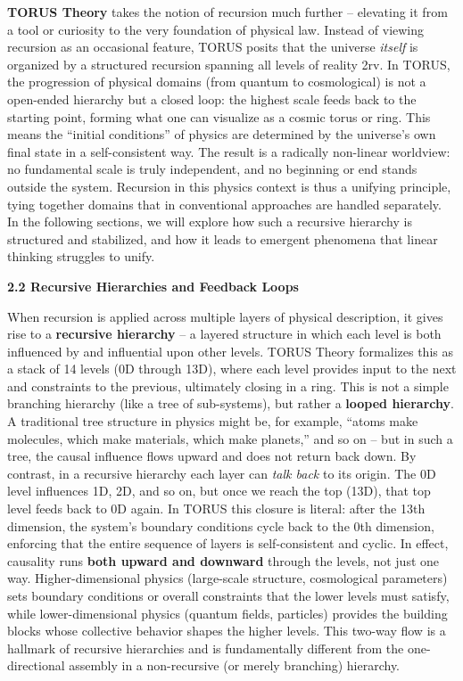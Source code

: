\textbf{TORUS Theory} takes the notion of recursion much further --
elevating it from a tool or curiosity to the very foundation of physical
law. Instead of viewing recursion as an occasional feature, TORUS posits
that the universe \emph{itself} is organized by a structured recursion
spanning all levels of reality​ 2rv. In TORUS, the progression of
physical domains (from quantum to cosmological) is not a open-ended
hierarchy but a closed loop: the highest scale feeds back to the
starting point, forming what one can visualize as a cosmic torus or
ring. This means the ``initial conditions'' of physics are determined by
the universe's own final state in a self-consistent way. The result is a
radically non-linear worldview: no fundamental scale is truly
independent, and no beginning or end stands outside the system.
Recursion in this physics context is thus a unifying principle, tying
together domains that in conventional approaches are handled separately.
In the following sections, we will explore how such a recursive
hierarchy is structured and stabilized, and how it leads to emergent
phenomena that linear thinking struggles to unify.

\textbf{2.2 Recursive Hierarchies and Feedback Loops}

When recursion is applied across multiple layers of physical
description, it gives rise to a \textbf{recursive hierarchy} -- a
layered structure in which each level is both influenced by and
influential upon other levels. TORUS Theory formalizes this as a stack
of 14 levels (0D through 13D), where each level provides input to the
next and constraints to the previous, ultimately closing in a ring. This
is not a simple branching hierarchy (like a tree of sub-systems), but
rather a \textbf{looped hierarchy}. A traditional tree structure in
physics might be, for example, ``atoms make molecules, which make
materials, which make planets,'' and so on -- but in such a tree, the
causal influence flows upward and does not return back down. By
contrast, in a recursive hierarchy each layer can \emph{talk back} to
its origin. The 0D level influences 1D, 2D, and so on, but once we reach
the top (13D), that top level feeds back to 0D again​. In TORUS this
closure is literal: after the 13th dimension, the system's boundary
conditions cycle back to the 0th dimension, enforcing that the entire
sequence of layers is self-consistent and cyclic. In effect, causality
runs \textbf{both upward and downward} through the levels, not just one
way. Higher-dimensional physics (large-scale structure, cosmological
parameters) sets boundary conditions or overall constraints that the
lower levels must satisfy, while lower-dimensional physics (quantum
fields, particles) provides the building blocks whose collective
behavior shapes the higher levels. This two-way flow is a hallmark of
recursive hierarchies and is fundamentally different from the
one-directional assembly in a non-recursive (or merely branching)
hierarchy.

